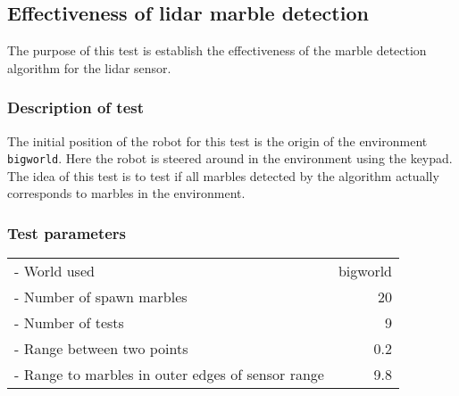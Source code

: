 \documentclass[../Head/Main.tex]{subfiles}
\begin{document}
\subsection{Effectiveness of lidar marble detection}

The purpose of this test is establish the effectiveness of the marble detection algorithm for the lidar sensor.

\subsubsection*{Description of test}
The initial position of the robot for this test is the origin of the environment \texttt{bigworld}. Here the robot is steered around in the environment using the keypad. The idea of this test is to test if all marbles detected by the algorithm actually corresponds to marbles in the environment.     

\subsubsection*{Test parameters}
\begin{tabular}{l r}
	- World used                & bigworld\\	
	- Number of spawn marbles   & 20\\
	- Number of tests           & 9\\
	- Range between two points  & 0.2\\
	- Range to marbles in outer edges of sensor range & 9.8
\end{tabular}
\end{document}
